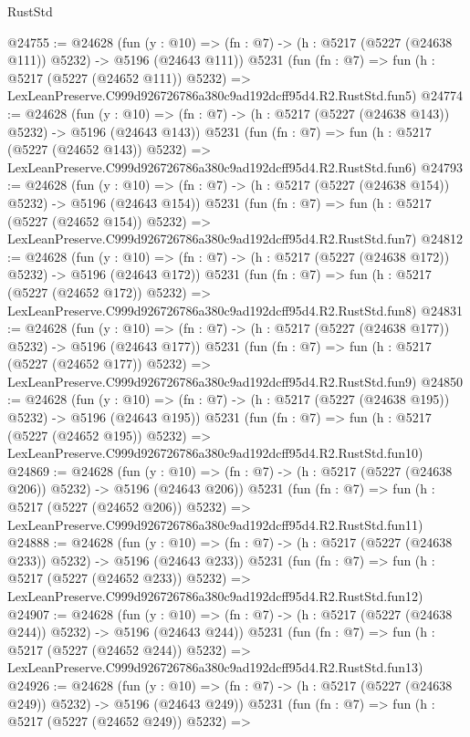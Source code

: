 \begin{lexlean}{RustStd}
\begin{coremodule}
@24755 := @24628
    (fun (y : @10) => (fn : @7) -> (h : @5217 (@5227 (@24638 @111)) @5232) -> @5196 (@24643 @111))
    @5231
    (fun (fn : @7) =>
    fun (h : @5217 (@5227 (@24652 @111)) @5232) =>
    LexLeanPreserve.C999d926726786a380c9ad192dcff95d4.R2.RustStd.fun5)
@24774 := @24628
    (fun (y : @10) => (fn : @7) -> (h : @5217 (@5227 (@24638 @143)) @5232) -> @5196 (@24643 @143))
    @5231
    (fun (fn : @7) =>
    fun (h : @5217 (@5227 (@24652 @143)) @5232) =>
    LexLeanPreserve.C999d926726786a380c9ad192dcff95d4.R2.RustStd.fun6)
@24793 := @24628
    (fun (y : @10) => (fn : @7) -> (h : @5217 (@5227 (@24638 @154)) @5232) -> @5196 (@24643 @154))
    @5231
    (fun (fn : @7) =>
    fun (h : @5217 (@5227 (@24652 @154)) @5232) =>
    LexLeanPreserve.C999d926726786a380c9ad192dcff95d4.R2.RustStd.fun7)
@24812 := @24628
    (fun (y : @10) => (fn : @7) -> (h : @5217 (@5227 (@24638 @172)) @5232) -> @5196 (@24643 @172))
    @5231
    (fun (fn : @7) =>
    fun (h : @5217 (@5227 (@24652 @172)) @5232) =>
    LexLeanPreserve.C999d926726786a380c9ad192dcff95d4.R2.RustStd.fun8)
@24831 := @24628
    (fun (y : @10) => (fn : @7) -> (h : @5217 (@5227 (@24638 @177)) @5232) -> @5196 (@24643 @177))
    @5231
    (fun (fn : @7) =>
    fun (h : @5217 (@5227 (@24652 @177)) @5232) =>
    LexLeanPreserve.C999d926726786a380c9ad192dcff95d4.R2.RustStd.fun9)
@24850 := @24628
    (fun (y : @10) => (fn : @7) -> (h : @5217 (@5227 (@24638 @195)) @5232) -> @5196 (@24643 @195))
    @5231
    (fun (fn : @7) =>
    fun (h : @5217 (@5227 (@24652 @195)) @5232) =>
    LexLeanPreserve.C999d926726786a380c9ad192dcff95d4.R2.RustStd.fun10)
@24869 := @24628
    (fun (y : @10) => (fn : @7) -> (h : @5217 (@5227 (@24638 @206)) @5232) -> @5196 (@24643 @206))
    @5231
    (fun (fn : @7) =>
    fun (h : @5217 (@5227 (@24652 @206)) @5232) =>
    LexLeanPreserve.C999d926726786a380c9ad192dcff95d4.R2.RustStd.fun11)
@24888 := @24628
    (fun (y : @10) => (fn : @7) -> (h : @5217 (@5227 (@24638 @233)) @5232) -> @5196 (@24643 @233))
    @5231
    (fun (fn : @7) =>
    fun (h : @5217 (@5227 (@24652 @233)) @5232) =>
    LexLeanPreserve.C999d926726786a380c9ad192dcff95d4.R2.RustStd.fun12)
@24907 := @24628
    (fun (y : @10) => (fn : @7) -> (h : @5217 (@5227 (@24638 @244)) @5232) -> @5196 (@24643 @244))
    @5231
    (fun (fn : @7) =>
    fun (h : @5217 (@5227 (@24652 @244)) @5232) =>
    LexLeanPreserve.C999d926726786a380c9ad192dcff95d4.R2.RustStd.fun13)
@24926 := @24628
    (fun (y : @10) => (fn : @7) -> (h : @5217 (@5227 (@24638 @249)) @5232) -> @5196 (@24643 @249))
    @5231
    (fun (fn : @7) =>
    fun (h : @5217 (@5227 (@24652 @249)) @5232) =>

\end{coremodule}
\end{lexlean}
